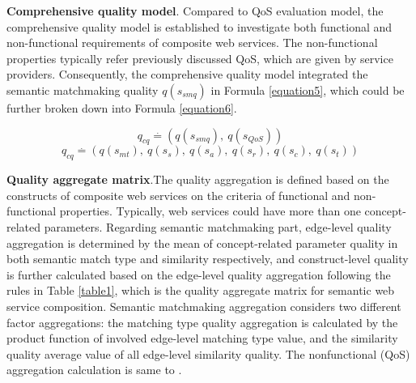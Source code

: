 \documentclass{llncs}
\begin{document}
\textbf{Comprehensive quality model}. Compared to QoS evaluation model, the comprehensive quality model is established to investigate both functional and non-functional requirements of composite web services. The non-functional properties typically refer previously discussed QoS, which are given by service providers. Consequently, the comprehensive quality model integrated the semantic matchmaking quality $q(s_{smq})$ in Formula \ref{equation5}, which could be further broken down into Formula \ref{equation6}.

\begin{equation}
\label{equation5}
q_{cq} \stackrel{.}{=} (q(s_ {smq}), \  q(s_ {QoS}))
\end{equation}
\begin{equation}
\label{equation6}
q_{cq} \stackrel{.}{=} (q(s_ {mt}), \  q(s_ {s}), \  q(s_{a}),\  q(s_{r}),\  q(s_{c}),\  q(s_{t}))
\end{equation}

\textbf{Quality aggregate matrix}.The quality aggregation is defined based on the constructs of composite web services on the criteria of functional and non-functional properties. Typically, web services could have more than one concept-related parameters. Regarding semantic matchmaking part, edge-level quality aggregation is determined by the mean of concept-related parameter quality in both semantic match type and similarity respectively, and construct-level quality is further calculated based on the edge-level quality aggregation following the rules in Table \ref{table1}, which is the quality aggregate matrix for semantic web service composition. Semantic matchmaking aggregation considers two different factor aggregations: the matching type quality aggregation is calculated by the product function of involved edge-level matching type value, and the similarity quality average value of all edge-level similarity quality. The nonfunctional (QoS) aggregation calculation is same to \cite{cardoso2004quality}.
\end{document}
